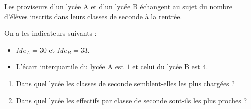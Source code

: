 \begin{exo}
	Les proviseurs d'un lycée A et d'un lycée B échangent au sujet du nombre d'élèves inscrits dans leurs classes de seconde à la rentrée.

	On a les indicateurs suivants :
	\begin{itemize}
		\item $Me_{A} = 30$ et $Me_{B} = 33$.
		\item L'écart interquartile du lycée A est $1$ et celui du lycée B est $4$.
	\end{itemize}

	\begin{enumerate}
		\item Dans quel lycée les classes de seconde semblent-elles les plus chargées ?
		\item Dans quel lycée les effectifs par classe de seconde sont-ils les plus proches ?
	\end{enumerate}
\end{exo}
